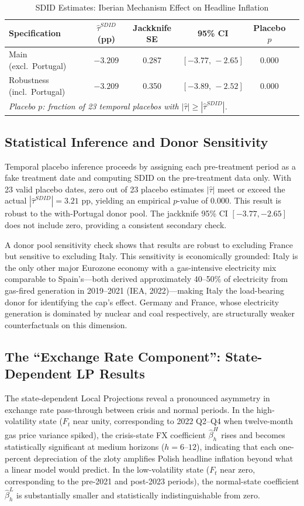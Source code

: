 \documentclass[12pt, a4paper]{article}
\begin{document}
\begin{table}[ht]
\centering
\caption{SDID Estimates: Iberian Mechanism Effect on Headline Inflation}
\label{tab:sdid_results}
\begin{tabular}{lccccc}
\toprule
Specification & $\hat{\tau}^{SDID}$ (pp) & Jackknife SE & 95\% CI & Placebo $p$ \\
\midrule
Main (excl.\ Portugal) & $-3.209$ & 0.287 & $[-3.77,\,-2.65]$ & 0.000 \\
Robustness (incl.\ Portugal) & $-3.209$ & 0.350 & $[-3.89,\,-2.52]$ & 0.000 \\
\bottomrule
\multicolumn{5}{l}{\small\textit{Placebo $p$: fraction of 23 temporal placebos with $|\hat{\tau}| \geq |\hat{\tau}^{SDID}|$.}}
\end{tabular}
\end{table}


\subsection{Statistical Inference and Donor Sensitivity}

Temporal placebo inference proceeds by assigning each pre-treatment period as a fake treatment date and computing SDID on the pre-treatment data only. With 23 valid placebo dates, zero out of 23 placebo estimates $|\hat{\tau}|$ meet or exceed the actual $|\hat{\tau}^{SDID}| = 3.21$ pp, yielding an empirical $p$-value of 0.000. This result is robust to the with-Portugal donor pool. The jackknife 95\% CI $[-3.77, -2.65]$ does not include zero, providing a consistent secondary check.

A donor pool sensitivity check shows that results are robust to excluding France but sensitive to excluding Italy. This sensitivity is economically grounded: Italy is the only other major Eurozone economy with a gas-intensive electricity mix comparable to Spain's---both derived approximately 40--50\% of electricity from gas-fired generation in 2019--2021 (IEA, 2022)---making Italy the load-bearing donor for identifying the cap's effect. Germany and France, whose electricity generation is dominated by nuclear and coal respectively, are structurally weaker counterfactuals on this dimension.


\subsection{The ``Exchange Rate Component'': State-Dependent LP Results}

The state-dependent Local Projections reveal a pronounced asymmetry in exchange rate pass-through between crisis and normal periods. In the high-volatility state ($F_t$ near unity, corresponding to 2022 Q2--Q4 when twelve-month gas price variance spiked), the crisis-state FX coefficient $\hat{\beta}^{H}_h$ rises and becomes statistically significant at medium horizons ($h = 6$--$12$), indicating that each one-percent depreciation of the zloty amplifies Polish headline inflation beyond what a linear model would predict. In the low-volatility state ($F_t$ near zero, corresponding to the pre-2021 and post-2023 periods), the normal-state coefficient $\hat{\beta}^{L}_h$ is substantially smaller and statistically indistinguishable from zero.
\end{document}
